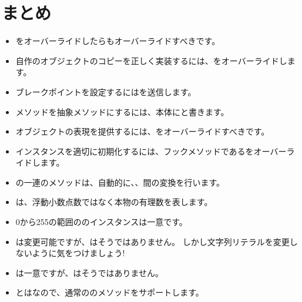 \documentclass[a4paper,10pt,twoside]{book}
\begin{document}

\section{まとめ}

\begin{itemize}

  \item \ct{=}をオーバーライドしたらもオーバーライドすべきです。

  \item 自作のオブジェクトのコピーを正しく実装するには、をオーバーライドします。

  \item ブレークポイントを設定するにはを送信します。

  \item メソッドを抽象メソッドにするには、本体にと書きます。

  \item オブジェクトの表現を提供するには、をオーバーライドすべきです。

  \item インスタンスを適切に初期化するには、フックメソッドであるをオーバーライドします。

  \item {}の一連のメソッドは、自動的に、、間の変換を行います。

  \item {}は、浮動小数点数ではなく本物の有理数を表します。

  \item 0から255の範囲ののインスタンスは一意です。

  \item {}は変更可能ですが、はそうではありません。
  しかし文字列リテラルを変更しないように気をつけましょう!

  \item {}は一意ですが、はそうではありません。

  \item {}とはなので、通常ののメソッドをサポートします。

\end{itemize}

\ifx\wholebook\relax\else
   
   
\end{document}
